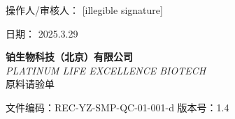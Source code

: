 \documentclass[UTF8,10pt,a4paper,fontset=fandol]{ctexart}
\newcommand{\fieldvalue}[1]{#1}
\newcommand{\handwritten}[1]{#1}
\begin{document}
\vfill

\noindent 操作人/审核人：%
\fieldvalue{\handwritten{[illegible signature]}}

\hfill 日期：%
\fieldvalue{\handwritten{2025.3.29}}

\newpage

\begin{center}
\textbf{铂生物科技（北京）有限公司}\\
\textit{PLATINUM LIFE EXCELLENCE BIOTECH}\\[2mm]
原料请验单
\end{center}

\noindent
文件编码：REC-YZ-SMP-QC-01-001-d
\hfill
版本号：1.4
\end{document}
